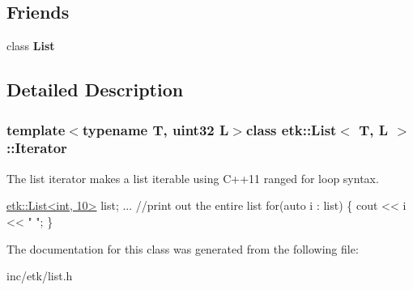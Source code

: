 \subsection*{Friends}
\begin{DoxyCompactItemize}
\item 
\hypertarget{classetk_1_1_list_1_1_iterator_a8cee552d09eaeb60a09d95309a87b498}{class {\bfseries List}}\label{classetk_1_1_list_1_1_iterator_a8cee552d09eaeb60a09d95309a87b498}

\end{DoxyCompactItemize}


\subsection{Detailed Description}
\subsubsection*{template$<$typename T, uint32 L$>$class etk\-::\-List$<$ T, L $>$\-::\-Iterator}

The list iterator makes a list iterable using C++11 ranged for loop syntax. 


\begin{DoxyCode}
\hyperlink{classetk_1_1_list}{etk::List<int, 10>} list;
...
\textcolor{comment}{//print out the entire list}
for(\textcolor{keyword}{auto} i : list)
\{
    cout << i << \textcolor{stringliteral}{" "};
\}
\end{DoxyCode}
 

The documentation for this class was generated from the following file\-:\begin{DoxyCompactItemize}
\item 
inc/etk/list.\-h\end{DoxyCompactItemize}
